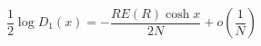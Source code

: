 \begin{equation}
\frac{1}{2}\log{D_1(x)}  =-\frac{RE(R)\cosh{x}}{2N}+o(\frac{1}{N})
\end{equation}

